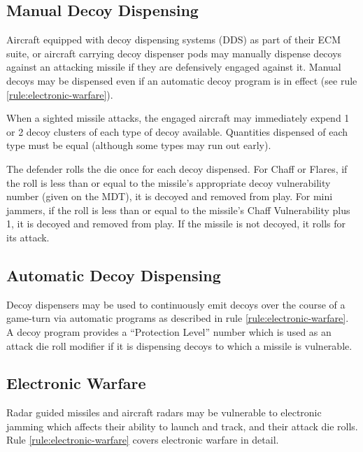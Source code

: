 \subsection{Manual Decoy Dispensing} Aircraft equipped with decoy dispensing systems (DDS) as part of their ECM suite, or aircraft carrying decoy dispenser pods may manually dispense decoys against an attacking missile if they are defensively engaged against it. Manual decoys may be dispensed even if an automatic decoy program is in effect (see rule \ref{rule:electronic-warfare}).

When a sighted missile attacks, the engaged aircraft may immediately expend 1 or 2 decoy clusters of each type of decoy available. Quantities dispensed of each type must be equal (although some types may run out early).

The defender rolls the die once for each decoy dispensed. For Chaff or Flares, if the roll is less than or equal to the missile's appropriate decoy vulnerability number (given on the MDT), it is decoyed and removed from play. For mini jammers, if the roll is less than or equal to the missile's Chaff Vulnerability plus 1, it is decoyed and removed from play. If the missile is not decoyed, it rolls for its attack.

\subsection{Automatic Decoy Dispensing} Decoy dispensers may be used to continuously emit decoys over the course of a game-turn via automatic programs as described in rule \ref{rule:electronic-warfare}. A decoy program provides a “Protection Level” number which is used as an attack die roll modifier if it is dispensing decoys to which a missile is vulnerable.

\subsection{Electronic Warfare} Radar guided missiles and aircraft radars may be vulnerable to electronic jamming which affects their ability to launch and track, and their attack die rolls. Rule \ref{rule:electronic-warfare} covers electronic warfare in detail.


